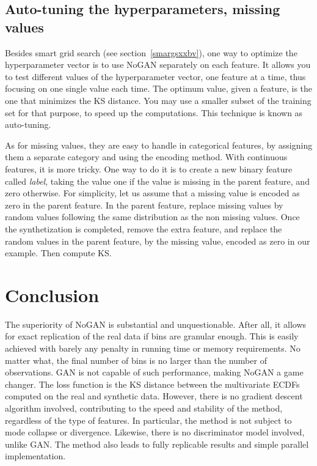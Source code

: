 \documentclass[oneside,10pt]{book}
\begin{document}
\subsection{Auto-tuning the hyperparameters, missing values}\label{attrere}

Besides \textcolor{index}{smart grid search} (see section~\ref{smargsxxbv}), one way to optimize the hyperparameter vector is to use NoGAN separately on each feature. It allows you to test different values of the hyperparameter vector, one feature at a time, thus focusing on one single value each time. The optimum value, given a feature, is the one that minimizes the KS distance. You may use a smaller subset of the training set for that purpose, to speed up the computations. This technique is known as \textcolor{index}{auto-tuning}.

As for \textcolor{index}{missing values}, they are easy to handle in categorical features, by assigning them a separate category and using the encoding method. With continuous features, it is more tricky. One way to do it is to create a new binary feature called {\em label}, taking the value one if the value is missing in
 the parent feature, and zero otherwise. For simplicity, let us assume that a missing value is encoded as zero in the parent feature. In the parent feature, replace missing values by random values following the same distribution as the non missing values. Once the synthetization is completed, remove the extra feature, and replace the random values in the parent feature, by the missing value, encoded as zero in our example. Then compute KS. 







 

\section{Conclusion}

The superiority of NoGAN is substantial and unquestionable. After all, it allows for exact replication of the real data if bins are 
granular enough. This is easily achieved with barely any penalty in running time or memory requirements. 
No matter what, the final number of bins is no larger than the number of observations. GAN is not capable of such performance, making
 NoGAN a game changer. The \textcolor{index}{loss function} is the KS distance between the multivariate ECDFs computed on the real and synthetic data. However,
 there is no \textcolor{index}{gradient descent} algorithm involved, contributing to the speed and stability of the method, regardless of the type of features. In particular, the method is not subject to \textcolor{index}{mode collapse} or divergence.
 Likewise, there is no discriminator model involved, unlike GAN. The method also leads to fully replicable results and simple parallel  implementation.
\end{document}
